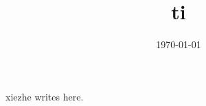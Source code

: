 \documentclass{mcmthesis}
\begin{document}
\linespread{0.6} %
\setlength{\parskip}{0.5\baselineskip} %
\title{ti}

\date{\today}
	\begin{abstract}

	
		\begin{keywords}
		
		\end{keywords}
	\end{abstract}

\maketitle

\tableofcontents


\begin{appendices}
xiezhe writes here.
\end{appendices}
\end{document}
